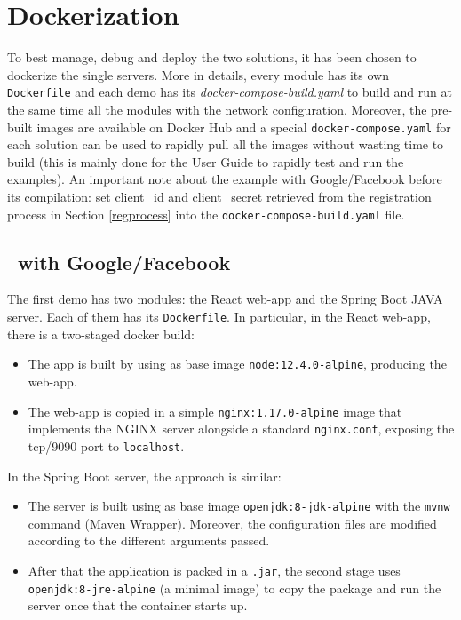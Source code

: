 \section{Dockerization}
To best manage, debug and deploy the two solutions, it has been chosen to dockerize the single servers. More in details, every module has its own \texttt{Dockerfile} and each demo has its \textit{docker-compose-build.yaml} to build and run at the same time all the modules with the network configuration. Moreover, the pre-built images are available on Docker Hub and a special \texttt{docker-compose.yaml} for each solution can be used to rapidly pull all the images without wasting time to build (this is mainly done for the User Guide to rapidly test and run the examples).
An important note about the example with Google/Facebook before its compilation: set client\_id and client\_secret retrieved from the registration process in Section \ref{regprocess} into the \texttt{docker-compose-build.yaml} file.

\subsection{\oauth\ with Google/Facebook}
The first demo has two modules: the React web-app and the Spring Boot JAVA server. Each of them has its \texttt{Dockerfile}. In particular, in the React web-app, there is a two-staged docker build:

\begin{itemize}
    \item The app is built by using as base image \texttt{node:12.4.0-alpine}, producing the web-app.
    \item The web-app is copied in a simple \texttt{nginx:1.17.0-alpine} image that implements the NGINX server alongside a standard \texttt{nginx.conf}, exposing the tcp/9090 port to \texttt{localhost}.
\end{itemize}

\noindent In the Spring Boot server, the approach is similar:

\begin{itemize}
    \item The server is built using as base image \texttt{openjdk:8-jdk-alpine} with the \texttt{mvnw} command (Maven Wrapper). Moreover, the configuration files are modified according to the different arguments passed.
    \item After that the application is packed in a \texttt{.jar}, the second stage uses \texttt{openjdk:8-jre-alpine} (a minimal image) to copy the package and run the server once that the container starts up.
\end{itemize}

